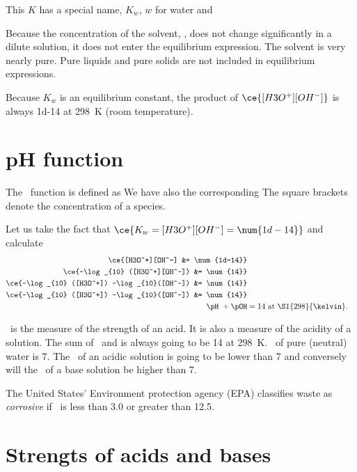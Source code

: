 \documentclass[../mit-general-chemistry.tex]{subfiles}
\begin{document}
This $K$ has a special name, $K_w$, $w$ for water and

\begin{remark}
  Because the concentration of the solvent, , does not change
  significantly in a dilute solution, it does not enter the equilibrium
  expression. The solvent is very nearly pure. Pure liquids and pure
  solids are not included in equilibrium expressions.
\end{remark}


Because $K_w$ is an equilibrium constant, the product of
$\ce{[H3O^+][OH^-]}$ is always \num{1d-14} at \SI{298}{\kelvin} (room
temperature).




\section{\si{pH} function}


The \pH\ function is defined as
We have also the corresponding
The square brackets denote the concentration of a species.

Let us take the fact that $\ce{K_w = [H3O^+][OH^-] = \num{1d-14}}$ and
calculate
\begin{align*}
  \ce{[H3O^+][OH^-] &= \num{1d-14}}\\
  \ce{-\log_{10} ([H3O^+][OH^-]) &= \num{14}} \\
  \ce{-\log_{10} ([H3O^+]) -\log_{10}([OH^-]) &= \num{14}} \\
  \ce{-\log_{10} ([H3O^+]) -\log_{10}([OH^-]) &= \num{14}} \\
  \pH\ + \pOH &= 14 ~\text{at \SI{298}{\kelvin}.}\\
\end{align*}

\pH\ is the measure of the strength of an acid. It is also a
measure of the acidity of a solution. The sum of \pH\ and
\pOH is always going to be 14 at \SI{298}{\kelvin}. \pH\ of
pure (neutral) water is 7. The \pH\ of an acidic solution is going
to be lower than 7 and conversely will the \pH\ of a base solution
be higher than 7.

The United States' Environment protection agency (EPA) classifies
waste as {\em corrosive} if \pH\ is less than \num{3.0} or greater
than \num{12.5}.





\section{Strengts of acids and bases}
\end{document}
